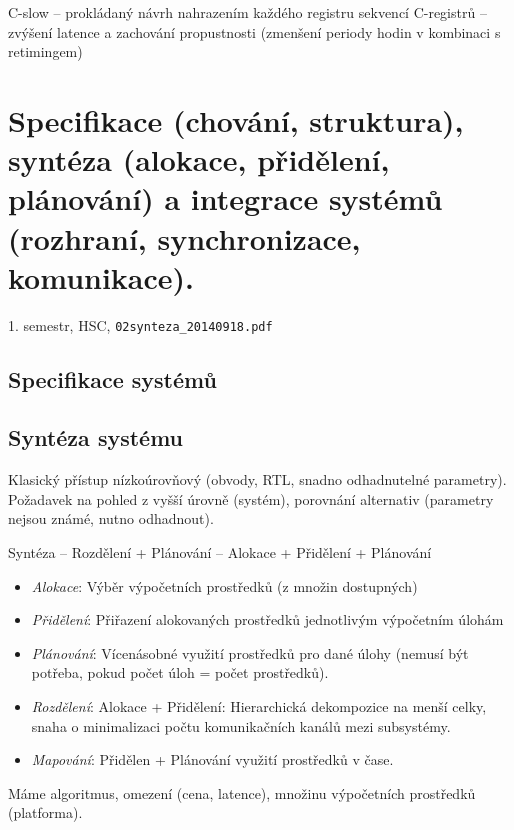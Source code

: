 \documentclass[a4paper, 11pt]{report}
\begin{document}
C-slow -- prokládaný návrh nahrazením každého registru sekvencí C-registrů -- zvýšení latence a zachování propustnosti (zmenšení periody hodin v kombinaci s retimingem)

\chapter{Specifikace (chování, struktura), syntéza (alokace, přidělení, plánování) a integrace systémů (rozhraní, synchronizace, komunikace).} \label{cha:3}
1. semestr, HSC, \texttt{02synteza\_20140918.pdf}

\section{Specifikace systémů}

\section{Syntéza systému}
Klasický přístup nízkoúrovňový (obvody, RTL, snadno odhadnutelné parametry). Požadavek na pohled z vyšší úrovně (systém), porovnání alternativ (parametry nejsou známé, nutno odhadnout).

Syntéza -- Rozdělení + Plánování -- Alokace + Přidělení + Plánování

\begin{itemize}
	\item \emph{Alokace}: Výběr výpočetních prostředků (z množin dostupných)\\
	\item \emph{Přidělení}: Přiřazení alokovaných prostředků jednotlivým výpočetním úlohám
	\item \emph{Plánování}: Vícenásobné využití prostředků pro dané úlohy (nemusí být potřeba, pokud počet úloh = počet prostředků).\\
	\item \emph{Rozdělení}: Alokace + Přidělení: Hierarchická dekompozice na menší celky, snaha o minimalizaci počtu komunikačních kanálů mezi subsystémy.\\
	\item \emph{Mapování}: Přidělen + Plánování využití prostředků v čase.
\end{itemize}

Máme algoritmus, omezení (cena, latence), množinu výpočetních prostředků (platforma).
\end{document}
